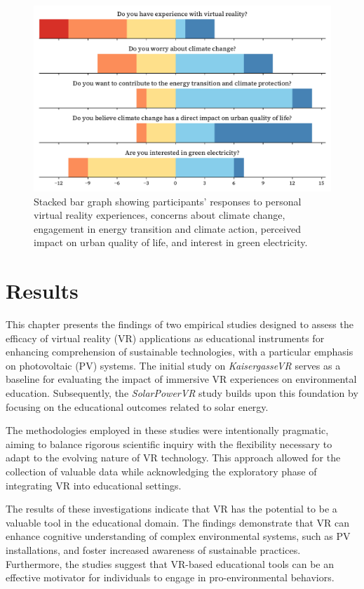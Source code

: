 \documentclass[draft, final]{vutinfth} %
\begin{document}
\begin{figure}[h]
    \centering
    \includegraphics[width=\textwidth]{graphics/participants-solarpowervr.pdf}
    \caption[Participant Responses Summary]{Stacked bar graph showing participants' responses to personal virtual reality experiences, concerns about climate change, engagement in energy transition and climate action, perceived impact on urban quality of life, and interest in green electricity.}
    \label{fig:participants_solarpowervr}
\end{figure}

\chapter{Results}
This chapter presents the findings of two empirical studies designed to assess the efficacy of virtual reality (VR) applications as educational instruments for enhancing comprehension of sustainable technologies, with a particular emphasis on photovoltaic (PV) systems. The initial study on \textit{KaisergasseVR} serves as a baseline for evaluating the impact of immersive VR experiences on environmental education. Subsequently, the \textit{SolarPowerVR} study builds upon this foundation by focusing on the educational outcomes related to solar energy.

The methodologies employed in these studies were intentionally pragmatic, aiming to balance rigorous scientific inquiry with the flexibility necessary to adapt to the evolving nature of VR technology. This approach allowed for the collection of valuable data while acknowledging the exploratory phase of integrating VR into educational settings.

The results of these investigations indicate that VR has the potential to be a valuable tool in the educational domain. The findings demonstrate that VR can enhance cognitive understanding of complex environmental systems, such as PV installations, and foster increased awareness of sustainable practices. Furthermore, the studies suggest that VR-based educational tools can be an effective motivator for individuals to engage in pro-environmental behaviors.
\end{document}
